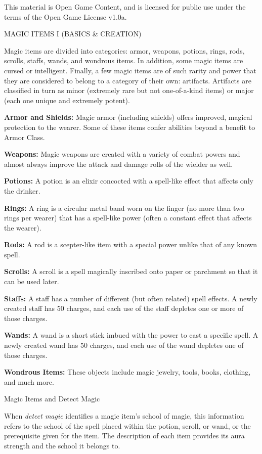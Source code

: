 \documentclass{article}
\begin{document}
This material is Open Game Content, and is licensed for public use under the terms 
of the Open Game License v1.0a.

{\LARGE{}MAGIC ITEMS I (BASICS \& CREATION)}

\vspace{12pt}
Magic items are divided into categories: armor, weapons, potions, rings, rods, 
scrolls, staffs, wands, and wondrous items. In addition, some magic items are cursed 
or intelligent. Finally, a few magic items are of such rarity and power that they 
are considered to belong to a category of their own: artifacts. Artifacts are classified 
in turn as minor (extremely rare but not one-of-a-kind items) or major (each one 
unique and extremely potent).

\textbf{Armor and Shields:} Magic armor (including shields) offers improved, magical 
protection to the wearer. Some of these items confer abilities beyond a benefit 
to Armor Class. 

\textbf{Weapons:} Magic weapons are created with a variety of combat powers and 
almost always improve the attack and damage rolls of the wielder as well.

\textbf{Potions:} A potion is an elixir concocted with a spell-like effect that 
affects only the drinker.

\textbf{Rings:} A ring is a circular metal band worn on the finger (no more than 
two rings per wearer) that has a spell-like power (often a constant effect that 
affects the wearer).

\textbf{Rods: }A rod is a scepter-like item with a special power unlike that of 
any known spell.

\textbf{Scrolls:} A scroll is a spell magically inscribed onto paper or parchment 
so that it can be used later.

\textbf{Staffs:} A staff has a number of different (but often related) spell effects. 
A newly created staff has 50 charges, and each use of the staff depletes one or 
more of those charges.

\textbf{Wands:} A wand is a short stick imbued with the power to cast a specific 
spell. A newly created wand has 50 charges, and each use of the wand depletes one 
of those charges.

\textbf{Wondrous Items:} These objects include magic jewelry, tools, books, clothing, 
and much more.

\vspace{12pt}
Magic Items and Detect Magic

When \textit{detect magic }identifies a magic item's school of magic, this information 
refers to the school of the spell placed within the potion, scroll, or wand, or 
the prerequisite given for the item. The description of each item provides its 
aura strength and the school it belongs to.
\end{document}
